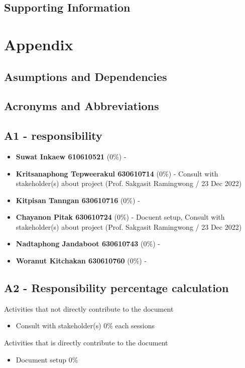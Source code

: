 \documentclass[ 10pt]{report}
\begin{document}
        \section{Supporting Information}
    \pagebreak


    \chapter{Appendix}
        \section{Asumptions and Dependencies}
        \section{Acronyms and Abbreviations}


        \section{A1 - responsibility}
        \begin{itemize}
            \item \textbf{Suwat Inkaew 610610521} (0\%) - 
            \item \textbf{Kritsanaphong Tepweerakul 630610714} (0\%) - Consult with stakeholder(s) about project (Prof. Sakgasit Ramingwong / 23 Dec 2022)
            \item \textbf{Kitpisan Tanngan 630610716} (0\%) - 
            \item \textbf{Chayanon Pitak 630610724} (0\%) - Docuent setup, Consult with stakeholder(s) about project (Prof. Sakgasit Ramingwong / 23 Dec 2022)
            \item \textbf{Nadtaphong Jandaboot 630610743} (0\%) - 
            \item \textbf{Woranut Kitchakan 630610760} (0\%) - 
        \end{itemize}

        \section{A2 - Responsibility percentage calculation}

        Activities that not directly contribute to the document
        \begin{itemize}
            \item Consult with stakeholder(s) 0\% each sessions
        \end{itemize}
        \indent\indent Activities that is directly contribute to the document
        \begin{itemize}
            \item Document setup 0\%
        \end{itemize}
\end{document}
